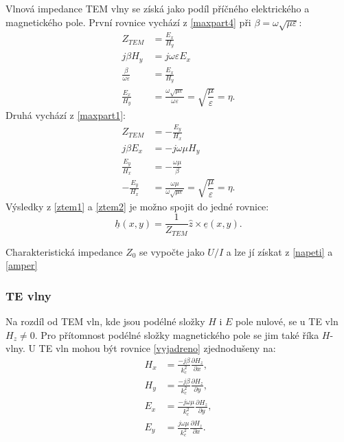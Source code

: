 \documentclass[12pt,a4paper,oneside]{article}
\numberwithin{equation}{section} %
\numberwithin{figure}{section} %
\numberwithin{table}{section} %
\newcommand{\faz}[1]{{\underline{#1}}} %
\begin{document}
Vlnová impedance TEM vlny se získá jako podíl příčného elektrického a magnetického pole. První rovnice vychází z \ref{maxpart4} při $\beta = \omega \sqrt{\mu \varepsilon}$:
\begin{subequations}
\label{ztem1}
\begin{align}
Z_{TEM} &= \frac{E_x}{H_y}
\\
j \beta H_y &= j \omega \varepsilon E_x
\\
\frac{\beta}{\omega \varepsilon} &= \frac{E_x}{H_y}
\\
\frac{E_x}{H_y} &= \frac{\omega \sqrt{\mu \varepsilon}}{\omega \varepsilon} = \sqrt{\dfrac{\mu}{\varepsilon}} = \eta .
\end{align}
\end{subequations}
Druhá vychází z \ref{maxpart1}:
\begin{subequations}
\label{ztem2}
\begin{align}
Z_{TEM} &= - \frac{E_y}{H_x}
\\
j \beta E_x &= - j \omega \mu H_y
\\
\frac{E_y}{H_x} &= - \frac{\omega \mu}{\beta}
\\
- \frac{E_y}{H_x} &= \frac{\omega \mu}{\omega \sqrt{\mu \varepsilon}} = \sqrt{\dfrac{\mu}{\varepsilon}} = \eta .
\end{align}
\end{subequations}
Výsledky z \ref{ztem1} a \ref{ztem2} je možno spojit do jedné rovnice:
\begin{equation}
\faz{h} (x, y) = \frac{1}{Z_{TEM}} \hat{z} \times \faz{e} (x, y) .
\end{equation}

Charakteristická impedance $Z_0$ se vypočte jako $U / I$ a lze jí získat z \ref{napeti} a \ref{amper}

\subsubsection{TE vlny}
Na rozdíl od TEM vln, kde jsou podélné složky $H$ i $E$ pole nulové, se u TE vln $H_z  \neq 0$. Pro přítomnost podélné složky magnetického pole se jim také říka $H$-vlny. U TE vln mohou být rovnice \ref{vyjadreno} zjednodušeny na:
\begin{subequations}
\begin{align}
H_x &= \frac{-j \beta}{k^2_c} \frac{\partial H_z}{\partial x} ,
\\
H_y &= \frac{-j \beta}{k^2_c} \frac{\partial H_z}{\partial y} ,
\\
E_x &= \frac{-j \omega \mu}{k^2_c} \frac{\partial H_z}{\partial y} ,
\\
E_y &= \frac{j \omega \mu}{k^2_c} \frac{\partial H_z}{\partial x} .
\end{align}
\end{subequations}
\end{document}
